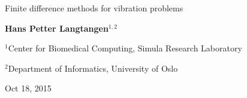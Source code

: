 \documentclass[%
oneside,                 %
final,                   %
10pt]{article}
\begin{document}







\thispagestyle{empty}

\begin{center}
{\LARGE\bf
\begin{spacing}{1.25}
Finite difference methods for vibration problems
\end{spacing}
}
\end{center}


\begin{center}
{\bf Hans Petter Langtangen${}^{1, 2}$} \\ [0mm]
\end{center}

\begin{center}
\centerline{{\small ${}^1$Center for Biomedical Computing, Simula Research Laboratory}}
\centerline{{\small ${}^2$Department of Informatics, University of Oslo}}
\end{center}
    

\begin{center}
Oct 18, 2015
\end{center}

\vspace{1cm}










\tableofcontents

\clearpage %
\end{document}
